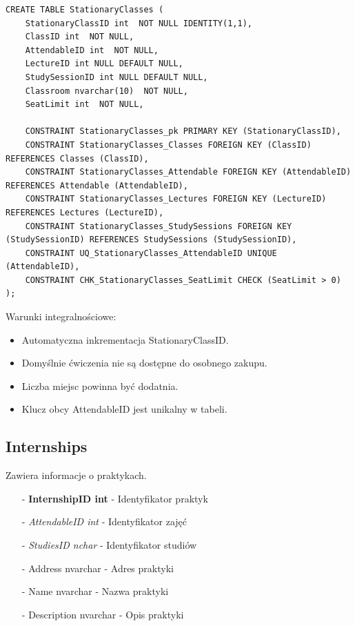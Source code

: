 \documentclass[11pt,a4paper]{article}
\begin{document}
\begin{Verbatim}[breaklines=true]
CREATE TABLE StationaryClasses (
    StationaryClassID int  NOT NULL IDENTITY(1,1),
    ClassID int  NOT NULL,
    AttendableID int  NOT NULL,
    LectureID int NULL DEFAULT NULL,
    StudySessionID int NULL DEFAULT NULL,
    Classroom nvarchar(10)  NOT NULL,
    SeatLimit int  NOT NULL,

    CONSTRAINT StationaryClasses_pk PRIMARY KEY (StationaryClassID),
    CONSTRAINT StationaryClasses_Classes FOREIGN KEY (ClassID) REFERENCES Classes (ClassID),
    CONSTRAINT StationaryClasses_Attendable FOREIGN KEY (AttendableID) REFERENCES Attendable (AttendableID),
    CONSTRAINT StationaryClasses_Lectures FOREIGN KEY (LectureID) REFERENCES Lectures (LectureID),
    CONSTRAINT StationaryClasses_StudySessions FOREIGN KEY (StudySessionID) REFERENCES StudySessions (StudySessionID),
    CONSTRAINT UQ_StationaryClasses_AttendableID UNIQUE (AttendableID),
    CONSTRAINT CHK_StationaryClasses_SeatLimit CHECK (SeatLimit > 0)
);
\end{Verbatim}

Warunki integralnościowe:
\begin{itemize}
    \item Automatyczna inkrementacja StationaryClassID.
    \item Domyślnie ćwiczenia nie są dostępne do osobnego zakupu.
    \item Liczba miejsc powinna być dodatnia.
    \item Klucz obcy AttendableID jest unikalny w tabeli.
\end{itemize}

\subsection{Internships}
Zawiera informacje o praktykach.

\begin{itemize}
    \item[-] \textbf{InternshipID int} - Identyfikator praktyk
    \item[-] \textit{AttendableID int} - Identyfikator zajęć
    \item[-] \textit{StudiesID nchar} - Identyfikator studiów
    \item[-] Address nvarchar - Adres praktyki
    \item[-] Name nvarchar - Nazwa praktyki
    \item[-] Description nvarchar - Opis praktyki
\end{itemize}
\end{document}
